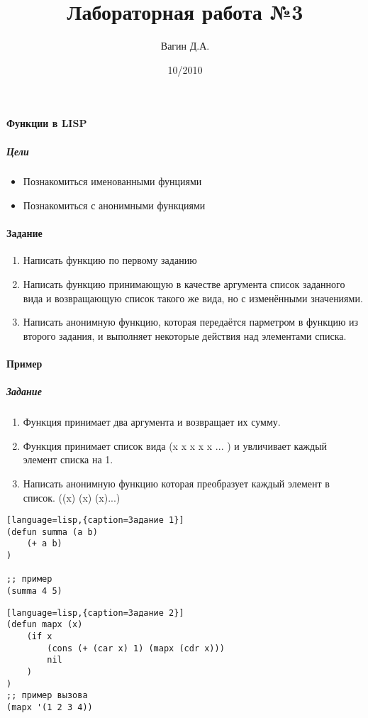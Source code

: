 \documentclass[a4paper,12pt]{article}
\title{Лабораторная работа №3}
\author{Вагин Д.А.}
\date{10/2010}
\begin{document}

\paragraph{Функции в LISP}
\subparagraph{Цели}
\begin{itemize}
	\item Познакомиться именованными фунциями
	\item Познакомиться с анонимными функциями
\end{itemize}

\paragraph{Задание}
\begin{enumerate}
	\item Написать функцию по первому заданию
	\item Написать функцию принимающую в качестве аргумента список заданного вида и возвращающую список такого же вида, но с изменёнными значениями.
	\item Написать анонимную функцию, которая передаётся парметром в функцию из второго задания, и выполняет некоторые действия над элементами списка.
\end{enumerate}

\paragraph{Пример}
\subparagraph{Задание}
\begin{enumerate}
	\item Функция принимает два аргумента и возвращает их сумму.
	\item Функция принимает список вида (x x x x x ... ) и увличивает каждый элемент списка на 1.
	\item Написать анонимную функцию которая преобразует каждый элемент в список. ((x) (x) (x)...)
\end{enumerate}

\begin{lstlisting}[language=lisp,{caption=Задание 1}]
(defun summa (a b) 
	(+ a b)
)

;; пример 
(summa 4 5)
\end{lstlisting}

\begin{lstlisting}[language=lisp,{caption=Задание 2}]
(defun mapx (x) 
	(if x
		(cons (+ (car x) 1) (mapx (cdr x)))
		nil
	)
)
;; пример вызова
(mapx '(1 2 3 4))
\end{lstlisting}
\end{document}
